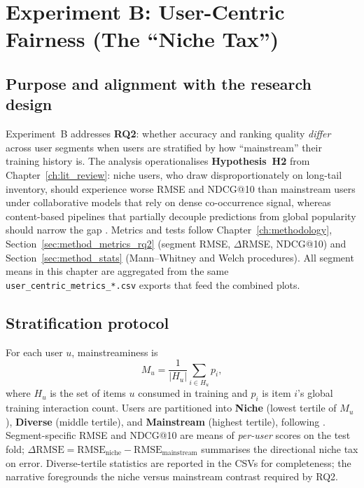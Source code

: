 \chapter{Experiment B: User-Centric Fairness (The ``Niche Tax'')}
\label{ch:exp_b}

\section{Purpose and alignment with the research design}
Experiment~B addresses \textbf{RQ2}: whether accuracy and ranking quality \emph{differ} across user segments when users are stratified by how ``mainstream'' their training history is. The analysis operationalises \textbf{Hypothesis~H2} from Chapter~\ref{ch:lit_review}: niche users, who draw disproportionately on long-tail inventory, should experience worse RMSE and NDCG@10 than mainstream users under collaborative models that rely on dense co-occurrence signal, whereas content-based pipelines that partially decouple predictions from global popularity should narrow the gap \citep{abdollahpouri2021usercentered, leonhardt2018userfairness}. Metrics and tests follow Chapter~\ref{ch:methodology}, Section~\ref{sec:method_metrics_rq2} (segment RMSE, $\Delta$RMSE, NDCG@10) and Section~\ref{sec:method_stats} (Mann--Whitney and Welch procedures). All segment means in this chapter are aggregated from the same \texttt{user\_centric\_metrics\_*.csv} exports that feed the combined plots.

\section{Stratification protocol}
For each user $u$, mainstreaminess is
\begin{equation}
  M_u = \frac{1}{|H_u|} \sum_{i \in H_u} p_i ,
\end{equation}
where $H_u$ is the set of items $u$ consumed in training and $p_i$ is item $i$'s global training interaction count. Users are partitioned into \textbf{Niche} (lowest tertile of $M_u$), \textbf{Diverse} (middle tertile), and \textbf{Mainstream} (highest tertile), following \citet{abdollahpouri2021usercentered}. Segment-specific RMSE and NDCG@10 are means of \emph{per-user} scores on the test fold; $\Delta\mathrm{RMSE} = \mathrm{RMSE}_{\text{niche}} - \mathrm{RMSE}_{\text{mainstream}}$ summarises the directional niche tax on error. Diverse-tertile statistics are reported in the CSVs for completeness; the narrative foregrounds the niche versus mainstream contrast required by RQ2.

